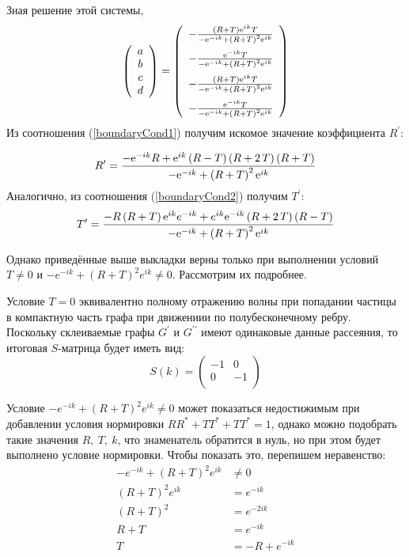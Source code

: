 \documentclass[a4 paper, 12 pt]{extarticle}
\begin{document}
   Зная решение этой системы,\[
   \left(\begin{array}{c}
   a \\
   b \\
   c \\
   d
   \end{array} \right) = 
   \left( \begin {array}{c} -{\frac { \left( R+T \right) {{\rm e}^{ik}}T
   	}{-{{\rm e}^{-ik}}+ \left(R+T\right)^2 {{\rm e}^{ik}
   }}}\\ \noalign{\medskip}-{\frac {{{\rm e}^{-ik}}T}{-{{\rm e}^{-ik}}+
   		\left(R+T\right)^2 {{\rm e}^{ik}}}}
   \\ \noalign{\medskip}-{\frac { \left( R+T \right) {{\rm e}^{ik}}T}{-{
   			{\rm e}^{-ik}}+ \left(R+T\right)^2 {{\rm e}^{ik}}}}
   \\ \noalign{\medskip}-{\frac {{{\rm e}^{-ik}}T}{-{{\rm e}^{-ik}}+
   		\left(R+T\right)^2 {{\rm e}^{ik}}}}\end {array}
   \right) 
   \]
   Из соотношения (\ref{boundaryCond1}) получим искомое значение коэффициента $R^\prime$:

   \[
   R^\prime = {\frac {-{{\rm e}^{-ik}}R+{{\rm e}^{ik}} \left( R-T \right)  \left( R+
   		2\,T \right)  \left( R+T \right) }{-{{\rm e}^{-ik}}+ \left( R+T\right)^2 {{\rm e}^{ik}}}}
   \]
   Аналогично, из соотношения (\ref{boundaryCond2}) получим $T^\prime$:
   \[
   T^\prime = {\frac {-R \left( R+T \right) {{\rm e}^{ik}}{e}^{-ik}+{e}^{ik}{{\rm e}
   			^{-ik}} \left( R+2\,T \right)  \left( R-T \right) }{-{{\rm e}^{-ik}}+
   		\left(R+T\right)^2 {{\rm e}^{ik}}}}
   \]
   
   Однако приведённые выше выкладки верны только при выполнении условий $T \neq 0$ и $-e^{-ik} + \left(R+T\right)^2 e^{ik} \neq 0$. Рассмотрим их подробнее.
   
   Условие $T = 0$ эквивалентно полному отражению волны при попадании частицы в компактную часть графа при движениии по полубесконечному ребру. Поскольку склеиваемые графы $G^\prime$ и $G^{\prime\prime}$ имеют одинаковые данные рассеяния, то итоговая $S$-матрица будет иметь вид:
   \[
   S(k)=\left(%
   \begin{array}{cc}
   -1 & 0 \\
   0 & -1 \\
   \end{array}%
   \right)
   \]
   
   Условие $-e^{-ik} + \left(R+T\right)^2 e^{ik} \neq 0$ может показаться недостижимым при добавлении условия нормировки $RR^* +TT^* +TT^* = 1$, однако можно подобрать такие значения $R, \ T, \ k$, что знаменатель обратится в нуль, но при этом будет выполнено условие нормировки. Чтобы показать это, перепишем неравенство:
   \[
   \begin{aligned}
   -e^{-ik} + \left(R+T\right)^2 e^{ik} &\neq 0 \\
   \left(R+T\right)^2 e^{ik} &= e^{-ik} \\
   \left(R+T\right)^2 &= e^{-2ik} \\
   R+T &= e^{-ik} \\
   T &= -R + e^{-ik}
   \end{aligned}
   \]
   
\end{document}
